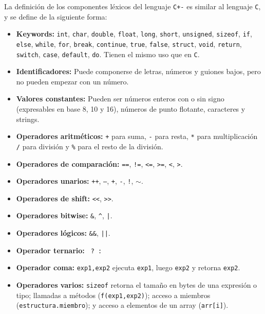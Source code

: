 \documentclass[12pt]{article}
\newcommand{\C}{\texttt{C}}
\begin{document}
    La definici\'on de los componentes l\'exicos del lenguaje \texttt{C+-} es similar al lenguaje \C, y se define de la siguiente forma:
    \begin{itemize}
        \item \textbf{Keywords:} \texttt{int}, \texttt{char}, \texttt{double}, \texttt{float}, \texttt{long}, \texttt{short}, \texttt{unsigned}, \texttt{sizeof}, \texttt{if}, \texttt{else}, \texttt{while}, \texttt{for}, \texttt{break}, \texttt{continue}, \texttt{true}, \texttt{false}, \texttt{struct}, \texttt{void}, \texttt{return}, \texttt{switch}, \texttt{case}, \texttt{default}, \texttt{do}. Tienen el mismo uso que en \C.
        \item \textbf{Identificadores:} Puede componerse de letras, n\'umeros y guiones bajos, pero no pueden empezar con un n\'umero.
        \item \textbf{Valores constantes:} Pueden ser n\'umeros enteros con o sin signo (expresables en base 8, 10 y 16), n\'umeros de punto flotante, caracteres y strings.
        \item \textbf{Operadores aritm\'eticos:} \texttt{+} para suma, \texttt{-} para resta, \texttt{*} para multiplicaci\'on \texttt{/} para divisi\'on y \texttt{\%} para el resto de la divisi\'on.
        \item \textbf{Operadores de comparaci\'on:} \texttt{==}, \texttt{!=}, \texttt{<=}, \texttt{>=}, \texttt{<}, \texttt{>}.
        \item \textbf{Operadores unarios:} \texttt{++}, \texttt{--}, \texttt{+}, \texttt{-}, \texttt{!}, $\mathtt\sim$.
        \item \textbf{Operadores de shift:} \texttt{<{}<}, \texttt{>{}>}.
        \item \textbf{Operadores bitwise:} \texttt{\&}, \texttt{\^}, \texttt{|}.
        \item \textbf{Operadores l\'ogicos:} \texttt{\&\&}, \texttt{||}.
        \item \textbf{Operador ternario:} \texttt{ ? : }
        \item \textbf{Operador coma:} \texttt{exp1,exp2} ejecuta \texttt{exp1}, luego \texttt{exp2} y retorna \texttt{exp2}.
        \item \textbf{Operadores varios:} \texttt{sizeof} retorna el tama\~no en bytes de una expresi\'on o tipo; llamadas a m\'etodos (\texttt{f(exp1,exp2)}); acceso a miembros (\texttt{estructura.miembro}); y acceso a elementos de un array (\texttt{arr[i]}).
    \end{itemize}
    
\end{document}
